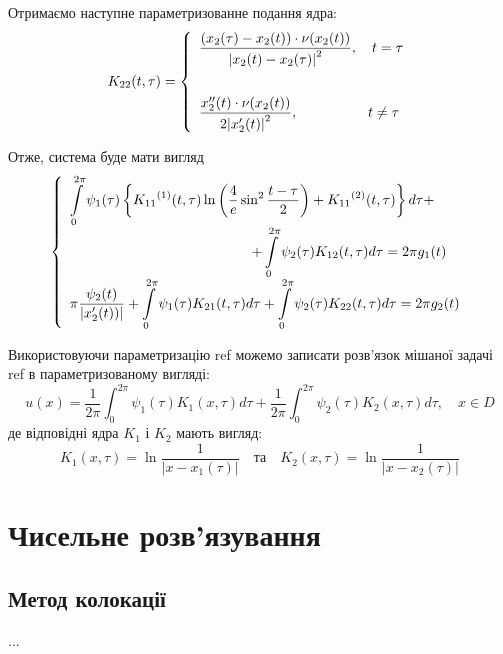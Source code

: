 \documentclass[14pt,a4paper]{extarticle}
\newcounter{e}
\numberwithin{equation}{section}
\newcommand{\intl}{\int\limits}
\newcommand{\inttwopi}{\intl_{0}^{2\pi}}
\begin{document}
Отримаємо наступне параметризованне подання ядра:
 $$
 K_{22}(t, \tau) = 
 \left\{
 \begin{array}{l}
	 \displaystyle
	 \frac{ \left( x_{2}(\tau) - x_{2}(t) \right) \cdot \nu (x_2(t)) }{ \abs{ x_{2}(t)-x_{2}(\tau) }^2 } 
	 ,\quad t = \tau
	 \\ [1cm]
 
 	\displaystyle
 	\frac{  x''_{2}(t) \cdot \nu (x_2(t)) }{ 2\abs{ x'_{2}(t)}^2 } 
 	,\quad \quad  \quad  \quad  \quad  t \neq \tau
 \end{array}
 \right.
$$

Отже, система буде мати вигляд
\begin{equation}
\label{IE-parametrized}
 \left\{
 \begin{array}{l}
 	\displaystyle
 	\inttwopi \psi_1(\tau) \left\{ {K_{11}}^{(1)} (t, \tau) \ln{\left( \frac{4}{e} \sin^{2}{\frac{t - \tau}{2}} \right) } + {K_{11}}^{(2)} (t, \tau) \right\} d \tau +
 	\\[0.3cm] \qquad \qquad \qquad \qquad \qquad \qquad \quad
 	\displaystyle
 	+ \inttwopi \psi_2(\tau) K_{12}(t, \tau) d \tau
 	= 2\pi g_{1}(t)
 	\\ [0.3cm]
 	
 	\displaystyle
 	\pi\frac{\psi_2(t)}{\abs{x'_{2}(t))}}
 	+ \inttwopi \psi_1(\tau) K_{21}(t, \tau) d \tau
 	+ \inttwopi \psi_2(\tau) K_{22}(t, \tau) d \tau
 	= 2\pi g_{2}(t)
 \end{array}\right.
\end{equation}
 
 Використовуючи параметризацію ref можемо записати розв'язок мішаної задачі ref в параметризованому вигляді:
 $$
 u(x)=\frac{1}{2 \pi} \int_{0}^{2 \pi} \psi_{1}(\tau) K_{1}(x, \tau) d \tau+\frac{1}{2 \pi} \int_{0}^{2 \pi} \psi_{2}(\tau) K_{2}(x, \tau) d \tau, \quad x \in D
 $$
 де відповідні ядра $K_{1}$ і $K_{2}$ мають вигляд:
 $$
  	K_{1}(x, \tau)=\ln \frac{1}{\left|x-x_{1}(\tau)\right|}
  	\quad \text{та} \quad 
 	K_{2}(x, \tau)=\ln \frac{1}{\left|x-x_{2}(\tau)\right|}
 $$
 
 
 
 
 \newpage
 \thispagestyle{empty}
 \section{Чисельне розв'язування}
 
 \subsection{Метод колокації}
 \hspace{0.7cm}...
 
\end{document}

